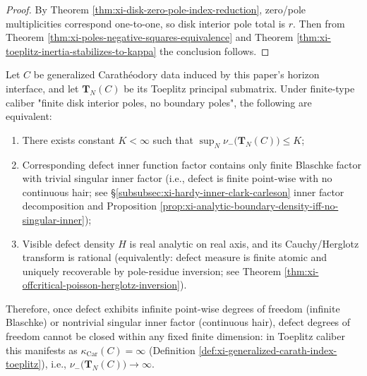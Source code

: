 \begin{proof}
By Theorem \ref{thm:xi-disk-zero-pole-index-reduction}, zero/pole multiplicities correspond one-to-one, so disk interior pole total is \(r\).
Then from Theorem \ref{thm:xi-poles-negative-squares-equivalence} and Theorem \ref{thm:xi-toeplitz-inertia-stabilizes-to-kappa} the conclusion follows.
\end{proof}

\begin{corollary}\label{cor:xi-discrete-vs-continuous-hair-by-negative-inertia}
Let \(C\) be generalized Carathéodory data induced by this paper's horizon interface, and let \(\mathbf{T}_N(C)\) be its Toeplitz principal submatrix.
Under finite-type caliber "finite disk interior poles, no boundary poles", the following are equivalent:
\begin{enumerate}
  \item There exists constant \(K<\infty\) such that
  \(\sup_{N}\nu_-\!\bigl(\mathbf{T}_N(C)\bigr)\le K\);
  \item Corresponding defect inner function factor contains only finite Blaschke factor with trivial singular inner factor (i.e., defect is finite point-wise with no continuous hair; see \S\ref{subsubsec:xi-hardy-inner-clark-carleson} inner factor decomposition and Proposition \ref{prop:xi-analytic-boundary-density-iff-no-singular-inner});
  \item Visible defect density \(H\) is real analytic on real axis, and its Cauchy/Herglotz transform is rational (equivalently: defect measure is finite atomic and uniquely recoverable by pole-residue inversion; see Theorem \ref{thm:xi-offcritical-poisson-herglotz-inversion}).
\end{enumerate}
Therefore, once defect exhibits infinite point-wise degrees of freedom (infinite Blaschke) or nontrivial singular inner factor (continuous hair), defect degrees of freedom cannot be closed within any fixed finite dimension: in Toeplitz caliber this manifests as \(\kappa_{\mathrm{Car}}(C)=\infty\) (Definition \ref{def:xi-generalized-carath-index-toeplitz}), i.e., \(\nu_-\!\bigl(\mathbf{T}_N(C)\bigr)\to\infty\).
\end{corollary}
